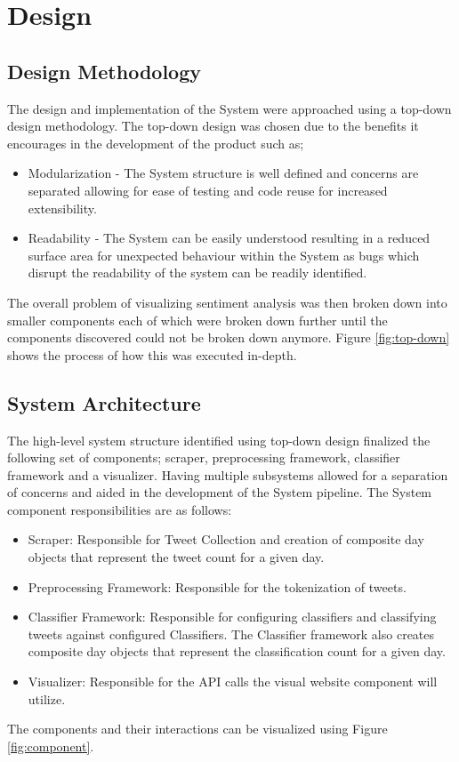 \documentclass[11pt]{report}
\begin{document}
\chapter{Design}

\section{Design Methodology}

The design and implementation of the System were approached using a top-down design methodology. The top-down design was chosen due to the benefits it encourages in the development of the product such as; 

\begin{itemize}
\item Modularization - The System structure is well defined and concerns are separated allowing for ease of testing and code reuse for increased extensibility.  

\item Readability - The System can be easily understood resulting in a reduced surface area for unexpected behaviour within the System as bugs which disrupt the readability of the system can be readily identified.
\end{itemize}
The overall problem of visualizing sentiment analysis was then broken down into smaller components each of which were broken down further until the components discovered could not be broken down anymore. Figure \ref{fig:top-down} shows the process of how this was executed in-depth.

\section{System Architecture}
The high-level system structure identified using top-down design finalized the following set of components; scraper, preprocessing framework, classifier framework and a visualizer. Having multiple subsystems allowed for a separation of concerns and aided in the development of the System pipeline.  The System component responsibilities are as follows:

\begin{itemize}
\item Scraper: Responsible for Tweet Collection and creation of composite day objects that represent the tweet count for a given day.
\item Preprocessing Framework: Responsible for the tokenization of tweets.
\item Classifier Framework: Responsible for configuring classifiers and classifying tweets against configured Classifiers. The Classifier framework also creates composite day objects that represent the classification count for a given day.
\item Visualizer: Responsible for the API calls the visual website component will utilize.
\end{itemize}
The components and their interactions can be visualized using Figure  \ref{fig:component}.
\\
\end{document}
